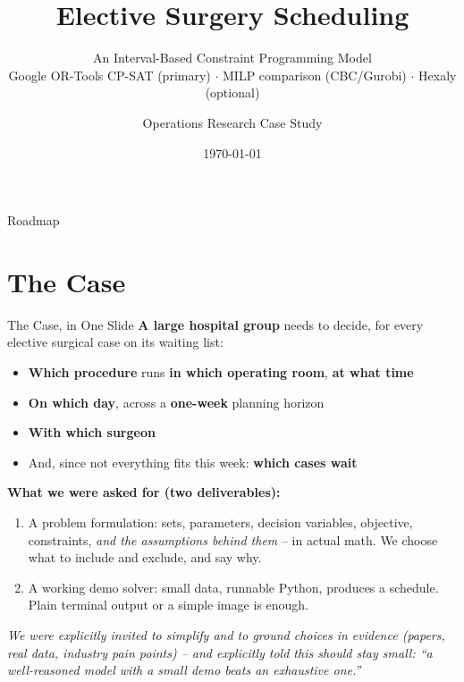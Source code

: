 \documentclass[aspectratio=169]{beamer}
\title{Elective Surgery Scheduling}
\subtitle{An Interval-Based Constraint Programming Model\\
\small Google OR-Tools CP-SAT (primary) $\cdot$ MILP comparison (CBC/Gurobi) $\cdot$ Hexaly (optional)}
\author{Operations Research Case Study}
\date{\today}
\begin{document}
\begin{frame}
  \titlepage
\end{frame}

\begin{frame}{Roadmap}
  \tableofcontents
\end{frame}

\section{The Case}

\begin{frame}{The Case, in One Slide}
  \textbf{A large hospital group} needs to decide, for every elective surgical case on
  its waiting list:
  \begin{itemize}
    \item \textbf{Which procedure} runs \textbf{in which operating room}, \textbf{at
      what time}
    \item \textbf{On which day}, across a \textbf{one-week} planning horizon
    \item \textbf{With which surgeon}
    \item And, since not everything fits this week: \textbf{which cases wait}
  \end{itemize}
  \vfill
  \textbf{What we were asked for (two deliverables):}
  \begin{enumerate}
    \item A problem formulation: sets, parameters, decision variables, objective,
      constraints, \emph{and the assumptions behind them} -- in actual math. We choose
      what to include and exclude, and say why.
    \item A working demo solver: small data, runnable Python, produces a schedule.
      Plain terminal output or a simple image is enough.
  \end{enumerate}
  \vfill
  \textit{We were explicitly invited to simplify and to ground choices in evidence
  (papers, real data, industry pain points) -- and explicitly told this should stay
  small: ``a well-reasoned model with a small demo beats an exhaustive one.''}
\end{frame}
\end{document}
